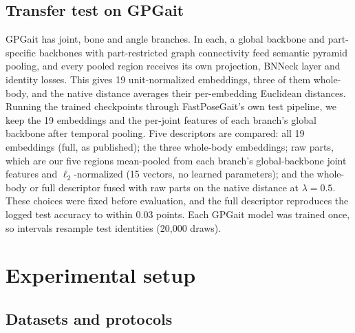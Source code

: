\documentclass[review,12pt]{elsarticle}
\begin{document}
\subsection{Transfer test on GPGait}
\label{sec:gpgait-design}

GPGait has joint, bone and angle branches. In each, a global backbone and
part-specific backbones with part-restricted graph connectivity feed semantic
pyramid pooling, and every pooled region receives its own projection, BNNeck
layer and identity losses. This gives 19 unit-normalized embeddings, three of
them whole-body, and the native distance averages their per-embedding Euclidean
distances. Running the trained checkpoints through FastPoseGait's own test
pipeline, we keep the 19 embeddings and the per-joint features of each branch's
global backbone after temporal pooling. Five descriptors are compared: all 19
embeddings (full, as published); the three whole-body embeddings; raw parts,
which are our five regions mean-pooled from each branch's global-backbone joint
features and $\ell_2$-normalized (15 vectors, no learned parameters); and the
whole-body or full descriptor fused with raw parts on the native distance at
$\lambda=0.5$. These choices were fixed before evaluation, and the full
descriptor reproduces the logged test accuracy to within 0.03 points. Each
GPGait model was trained once, so intervals resample test identities (20,000
draws).

\section{Experimental setup}
\label{sec:setup}

\subsection{Datasets and protocols}
\label{sec:data}
\end{document}
